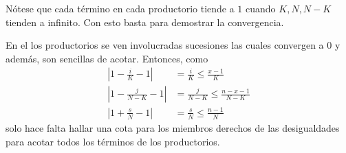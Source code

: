 \begin{Demo}
  Nótese que cada término en cada productorio tiende a $1$ cuando $K,N,N-K$
  tienden a infinito. Con esto basta para demostrar la convergencia.

  En el los productorios se ven involucradas sucesiones las cuales convergen
  a $0$ y además, son sencillas de acotar. Entonces, como
  \begin{align*}
    \left|1 - \frac{i}{K} - 1\right| &= \frac{i}{K} \leq \frac{x-1}{K}\\
    \left|1 - \frac{j}{N-K} - 1\right| &= \frac{j}{N-K} \leq \frac{n-x-1}{N-K}\\
    \left|1 + \frac{s}{N} - 1\right| &= \frac{s}{N} \leq \frac{n-1}{N}
  \end{align*}
  solo hace falta hallar una cota para los miembros derechos de las desigualdades para
  acotar todos los términos de los productorios.

  
\end{Demo}